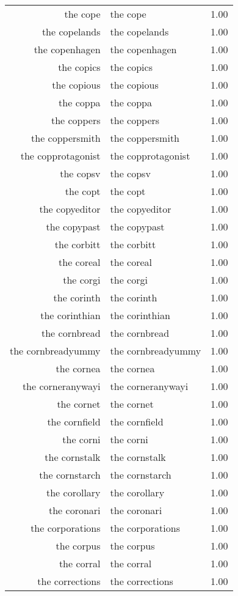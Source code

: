 \begin{table}[ht]
\begin{tabular}{rlr}
  the cope & the cope & 1.00 \\ 
  the copelands & the copelands & 1.00 \\ 
  the copenhagen & the copenhagen & 1.00 \\ 
  the copics & the copics & 1.00 \\ 
  the copious & the copious & 1.00 \\ 
  the coppa & the coppa & 1.00 \\ 
  the coppers & the coppers & 1.00 \\ 
  the coppersmith & the coppersmith & 1.00 \\ 
  the copprotagonist & the copprotagonist & 1.00 \\ 
  the copsv & the copsv & 1.00 \\ 
  the copt & the copt & 1.00 \\ 
  the copyeditor & the copyeditor & 1.00 \\ 
  the copypast & the copypast & 1.00 \\ 
  the corbitt & the corbitt & 1.00 \\ 
  the coreal & the coreal & 1.00 \\ 
  the corgi & the corgi & 1.00 \\ 
  the corinth & the corinth & 1.00 \\ 
  the corinthian & the corinthian & 1.00 \\ 
  the cornbread & the cornbread & 1.00 \\ 
  the cornbreadyummy & the cornbreadyummy & 1.00 \\ 
  the cornea & the cornea & 1.00 \\ 
  the corneranywayi & the corneranywayi & 1.00 \\ 
  the cornet & the cornet & 1.00 \\ 
  the cornfield & the cornfield & 1.00 \\ 
  the corni & the corni & 1.00 \\ 
  the cornstalk & the cornstalk & 1.00 \\ 
  the cornstarch & the cornstarch & 1.00 \\ 
  the corollary & the corollary & 1.00 \\ 
  the coronari & the coronari & 1.00 \\ 
  the corporations & the corporations & 1.00 \\ 
  the corpus & the corpus & 1.00 \\ 
  the corral & the corral & 1.00 \\ 
  the corrections & the corrections & 1.00 \\ 

\end{tabular}
\end{table}
